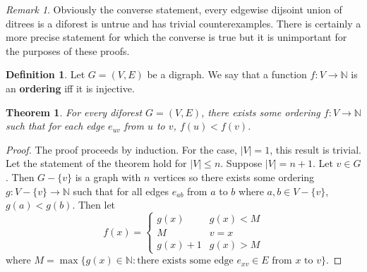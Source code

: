 \documentclass[12pt]{article}
\newcommand{\N}{\mathbb{N}}
\newtheorem{theorem}{Theorem}[section]
\theoremstyle{remark}
\newtheorem*{remark}{Remark}
\theoremstyle{definition}
\newtheorem{definition}{Definition}[section]
\begin{document}
\begin{remark} Obviously the converse statement, every edgewise dijsoint union of ditrees is a diforest is untrue and has trivial counterexamples. There is certainly a more precise statement for which the converse is true but it is unimportant for the purposes of these proofs.\end{remark}


\begin{definition} Let $G = (V,E)$ be a digraph. We say that a function $f: V \to \N$ is an \textbf{ordering} iff it is injective. 
\end{definition}

\begin{theorem} For every diforest $G = (V,E)$, there exists some ordering $f: V \to \N$ such that for each edge $e_{uv}$ from $u$ to $v$, $f(u) < f(v)$. 
\end{theorem}

\begin{proof} The proof proceeds by induction. For the case, $|V| = 1$, this result is trivial. Let the statement of the theorem hold for $|V| \leq n$. Suppose $|V| = n+1$.  Let $v \in G$. Then $G - \{v\}$ is a graph with $n$ vertices so there exists some ordering $g: V - \{v\} \to \N$ such that for all edges $e_{ab}$ from $a$ to $b$ where $a,b \in V - \{v\}$, $g(a) < g(b)$. Then let
$$f(x) = \begin{cases} g(x) & g(x) < M \\ 
M & v = x\\
g(x) + 1 & g(x) > M
\end{cases}$$ where $M = \max\{g(x) \in \N: \textrm{there exists some edge } e_{xv} \in E \textrm{ from } x \textrm{ to } v\}$.
\end{proof}
\end{document}
